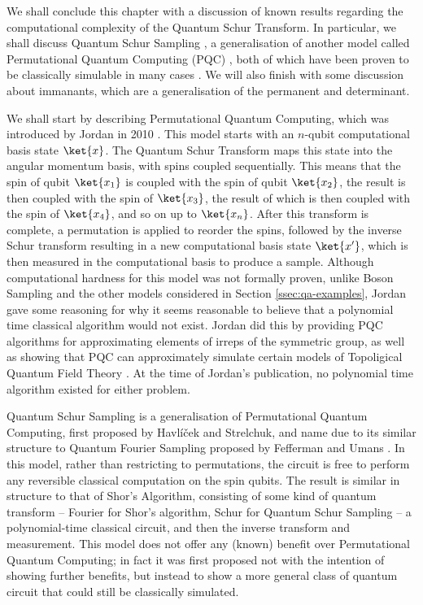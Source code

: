 We shall conclude this chapter with a discussion of known results regarding the computational complexity of the Quantum Schur Transform. In particular, we shall discuss Quantum Schur Sampling \cite{havlicek2018}, a generalisation of another model called Permutational Quantum Computing (PQC) \cite{jordan2010}, both of which have been proven to be classically simulable in many cases \cite{havlicek2019}. We will also finish with some discussion about immanants, which are a generalisation of the permanent and determinant.

We shall start by describing Permutational Quantum Computing, which was introduced by Jordan in 2010 \cite{jordan2010}. This model starts with an $n$-qubit computational basis state $\ket{x}$. The Quantum Schur Transform maps this state into the angular momentum basis, with spins coupled sequentially. This means that the spin of qubit $\ket{x_1}$ is coupled with the spin of qubit $\ket{x_2}$, the result is then coupled with the spin of $\ket{x_3}$, the result of which is then coupled with the spin of $\ket{x_4}$, and so on up to $\ket{x_n}$. After this transform is complete, a permutation is applied to reorder the spins, followed by the inverse Schur transform resulting in a new computational basis state $\ket{x'}$, which is then measured in the computational basis to produce a sample. Although computational hardness for this model was not formally proven, unlike Boson Sampling and the other models considered in Section \ref{ssec:qa-examples}, Jordan gave some reasoning for why it seems reasonable to believe that a polynomial time classical algorithm would not exist. Jordan did this by providing PQC algorithms for approximating elements of irreps of the symmetric group, as well as showing that PQC can approximately simulate certain models of Topoligical Quantum Field Theory \cite{jordan2010}. At the time of Jordan's publication, no polynomial time algorithm existed for either problem.

Quantum Schur Sampling is a generalisation of Permutational Quantum Computing, first proposed by Havl\'{i}\v{c}ek and Strelchuk, and name due to its similar structure to Quantum Fourier Sampling proposed by Fefferman and Umans \cite{fefferman2016}. In this model, rather than restricting to permutations, the circuit is free to perform any reversible classical computation on the spin qubits. The result is similar in structure to that of Shor's Algorithm, consisting of some kind of quantum transform -- Fourier for Shor's algorithm, Schur for Quantum Schur Sampling -- a polynomial-time classical circuit, and then the inverse transform and measurement. This model does not offer any (known) benefit over Permutational Quantum Computing; in fact it was first proposed not with the intention of showing further benefits, but instead to show a more general class of quantum circuit that could still be classically simulated.

